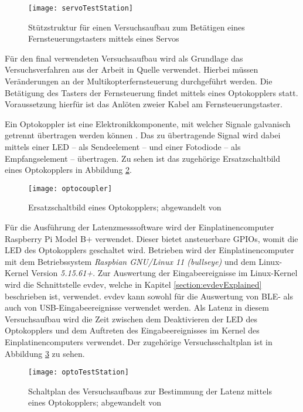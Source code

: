 \begin{figure}[H]
    \centering
    \texttt{[image: servoTestStation]}
    \caption{Stützstruktur für einen Versuchsaufbau zum Betätigen eines Fernsteuerungstasters mittels eines Servos}
    \label{fig:servoTestStation}
\end{figure}

Für den final verwendeten Versuchsaufbau wird als Grundlage das Versuchsverfahren aus der Arbeit in Quelle \cite{wimmerLatenzStation} verwendet. Hierbei müssen Veränderungen an der Multikopterfernsteuerung durchgeführt werden. Die Betätigung des Tasters der Fernsteuerung findet mittels eines Optokopplers statt. Voraussetzung hierfür ist das Anlöten zweier Kabel am Fernsteuerungstaster.

Ein Optokoppler ist eine Elektronikkomponente, mit welcher Signale galvanisch getrennt übertragen werden können \cite{elektronikKompendiumOptokoppler}. Das zu übertragende Signal wird dabei mittels einer \acs{LED} -- als Sendeelement -- und einer Fotodiode -- als Empfangselement -- übertragen. Zu sehen ist das zugehörige Ersatzschaltbild eines Optokopplers in Abbildung \ref{fig:optocoupler}.

\begin{figure}[H]
    \centering
    \texttt{[image: optocoupler]}
    \caption{Ersatzschaltbild eines Optokopplers; abgewandelt von \cite{altiumOptokoppler}}
    \label{fig:optocoupler}
\end{figure}

Für die Ausführung der Latenzmesssoftware wird der Einplatinencomputer Raspberry Pi Model B+ verwendet. Dieser bietet ansteuerbare \acsp{GPIO}, womit die \acs{LED} des Optokopplers geschaltet wird. Betrieben wird der Einplatinencomputer mit dem Betriebssystem \textit{Raspbian GNU/Linux 11 (bullseye)} und dem Linux-Kernel Version \textit{5.15.61+}. Zur Auswertung der Eingabeereignisse im Linux-Kernel wird die Schnittstelle evdev, welche in Kapitel \ref{section:evdevExplained} beschrieben ist, verwendet. evdev kann sowohl für die Auswertung von \ac{BLE}- als auch von \acs{USB}-Eingabeereignisse verwendet werden. Als Latenz in diesem Versuchsaufbau wird die Zeit zwischen dem Deaktivieren der \acs{LED} des Optokopplers und dem Auftreten des Eingabeereignisses im Kernel des Einplatinencomputers verwendet. Der zugehörige Versuchsschaltplan ist in Abbildung \ref{fig:optoTestStation} zu sehen.

\begin{figure}[H]
    \centering
    \texttt{[image: optoTestStation]}
    \caption{Schaltplan des Versuchsaufbaus zur Bestimmung der Latenz mittels eines Optokopplers; abgewandelt von \cites{wimmerLatenzStation}[S.~8; S.~12]{LTV817}}
    \label{fig:optoTestStation}
\end{figure}

